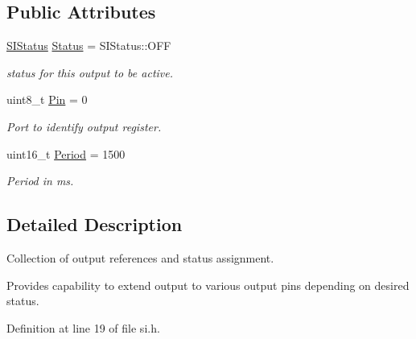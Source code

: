 \subsection*{Public Attributes}
\begin{DoxyCompactItemize}
\item 
\hyperlink{classSPMB_1_1StatusIndicator_a6d5ae5d45a9147ec76bd72da143fb4de}{S\+I\+Status} \hyperlink{structSPMB_1_1StatusIndicator_1_1StatusOutput_af616c94b4f3a6d8151eb062594a79598}{Status} = S\+I\+Status\+::\+O\+FF\hypertarget{structSPMB_1_1StatusIndicator_1_1StatusOutput_af616c94b4f3a6d8151eb062594a79598}{}\label{structSPMB_1_1StatusIndicator_1_1StatusOutput_af616c94b4f3a6d8151eb062594a79598}

\begin{DoxyCompactList}\small\item\em status for this output to be active. \end{DoxyCompactList}\item 
uint8\+\_\+t \hyperlink{structSPMB_1_1StatusIndicator_1_1StatusOutput_a042f8a5ff5a57c0b9bbc6fd293adb81a}{Pin} = 0\hypertarget{structSPMB_1_1StatusIndicator_1_1StatusOutput_a042f8a5ff5a57c0b9bbc6fd293adb81a}{}\label{structSPMB_1_1StatusIndicator_1_1StatusOutput_a042f8a5ff5a57c0b9bbc6fd293adb81a}

\begin{DoxyCompactList}\small\item\em Port to identify output register. \end{DoxyCompactList}\item 
uint16\+\_\+t \hyperlink{structSPMB_1_1StatusIndicator_1_1StatusOutput_a3c566b5f9a045d8ae12cea6e28fe10ec}{Period} = 1500\hypertarget{structSPMB_1_1StatusIndicator_1_1StatusOutput_a3c566b5f9a045d8ae12cea6e28fe10ec}{}\label{structSPMB_1_1StatusIndicator_1_1StatusOutput_a3c566b5f9a045d8ae12cea6e28fe10ec}

\begin{DoxyCompactList}\small\item\em Period in ms. \end{DoxyCompactList}\end{DoxyCompactItemize}


\subsection{Detailed Description}
Collection of output references and status assignment. 

Provides capability to extend output to various output pins depending on desired status. 

Definition at line 19 of file si.\+h.

